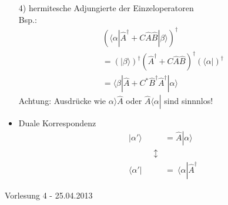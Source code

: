 \documentclass[10pt,article,colorback,accentcolor=tud9d]{scrartcl}
\begin{document}
\begin{fleqn}
\begin{itemize}
  4) hermitesche Adjungierte der Einzeloperatoren\\
  Bsp.:
  \begin{equation}
  \begin{aligned}
  &(\langle \alpha\left|\right.\hat{A}^{\dagger}+C\hat{A}\hat{B}\left|\right.\beta\rangle )^{\dagger}\\
  &= (\left|\right.\beta\rangle )^{\dagger} (\hat{A}^{\dagger}+C\hat{A}\hat{B})^{\dagger}(\langle \alpha\left|\right
.)^{\dagger}\\
  &= \langle \beta\left|\right. \hat{A} +C^*\hat{B}^{\dagger} \hat{A}^{\dagger} \left|\right.\alpha\rangle 
  \end{aligned}
  \end{equation}
  Achtung: Ausdrücke wie $\alpha\rangle \hat{A}$ oder $ \hat{A}\langle \alpha\left|\right.$ 
sind sinnnlos!
\item Duale Korrespondenz
  \begin{equation}
  \begin{aligned}
  &\left|\right.\alpha'\rangle &=\hat{A}\left|\right.\alpha\rangle \\
  & \quad \quad \quad \updownarrow&\\
  &\langle \alpha'\left|\right.&= \ \langle \alpha\left|\right.\hat{A}^{\dagger}
  \end{aligned}
  \end{equation}
\end{itemize}

\begin{flushright}
Vorlesung 4 - 25.04.2013
\end{flushright}


\end{fleqn}
\end{document}
